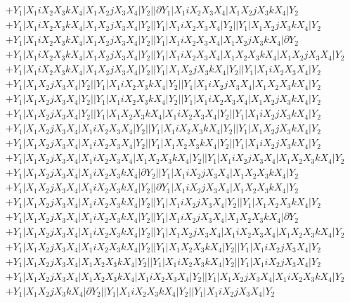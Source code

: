 \documentclass{article}[12pt]
\begin{document}
\begin{align*}
 & +Y_1|X_1iX_2X_3kX_4|X_1X_2jX_3X_4|Y_2||\partial Y_1|X_1iX_2X_3X_4|X_1X_2jX_3kX_4|Y_2\\ 
 & +Y_1|X_1iX_2X_3kX_4|X_1X_2jX_3X_4|Y_2||Y_1|X_1iX_2X_3X_4|Y_2||Y_1|X_1X_2jX_3kX_4|Y_2\\ 
 & +Y_1|X_1iX_2X_3kX_4|X_1X_2jX_3X_4|Y_2||Y_1|X_1iX_2X_3X_4|X_1X_2jX_3kX_4|\partial Y_2\\ 
 & +Y_1|X_1iX_2X_3kX_4|X_1X_2jX_3X_4|Y_2||Y_1|X_1iX_2X_3X_4|X_1X_2X_3kX_4|X_1X_2jX_3X_4|Y_2\\ 
 & +Y_1|X_1iX_2X_3kX_4|X_1X_2jX_3X_4|Y_2||Y_1|X_1X_2jX_3kX_4|Y_2||Y_1|X_1iX_2X_3X_4|Y_2\\ 
 & +Y_1|X_1X_2jX_3X_4|Y_2||Y_1|X_1iX_2X_3kX_4|Y_2||Y_1|X_1iX_2jX_3X_4|X_1X_2X_3kX_4|Y_2\\ 
 & +Y_1|X_1X_2jX_3X_4|Y_2||Y_1|X_1iX_2X_3kX_4|Y_2||Y_1|X_1iX_2X_3X_4|X_1X_2jX_3kX_4|Y_2\\ 
 & +Y_1|X_1X_2jX_3X_4|Y_2||Y_1|X_1X_2X_3kX_4|X_1iX_2X_3X_4|Y_2||Y_1|X_1iX_2jX_3kX_4|Y_2\\ 
 & +Y_1|X_1X_2jX_3X_4|X_1iX_2X_3X_4|Y_2||Y_1|X_1iX_2X_3kX_4|Y_2||Y_1|X_1X_2jX_3kX_4|Y_2\\ 
 & +Y_1|X_1X_2jX_3X_4|X_1iX_2X_3X_4|Y_2||Y_1|X_1X_2X_3kX_4|Y_2||Y_1|X_1iX_2jX_3kX_4|Y_2\\ 
 & +Y_1|X_1X_2jX_3X_4|X_1iX_2X_3X_4|X_1X_2X_3kX_4|Y_2||Y_1|X_1iX_2jX_3X_4|X_1X_2X_3kX_4|Y_2\\ 
 & +Y_1|X_1X_2jX_3X_4|X_1iX_2X_3kX_4|\partial Y_2||Y_1|X_1iX_2jX_3X_4|X_1X_2X_3kX_4|Y_2\\ 
 & +Y_1|X_1X_2jX_3X_4|X_1iX_2X_3kX_4|Y_2||\partial Y_1|X_1iX_2jX_3X_4|X_1X_2X_3kX_4|Y_2\\ 
 & +Y_1|X_1X_2jX_3X_4|X_1iX_2X_3kX_4|Y_2||Y_1|X_1iX_2jX_3X_4|Y_2||Y_1|X_1X_2X_3kX_4|Y_2\\ 
 & +Y_1|X_1X_2jX_3X_4|X_1iX_2X_3kX_4|Y_2||Y_1|X_1iX_2jX_3X_4|X_1X_2X_3kX_4|\partial Y_2\\ 
 & +Y_1|X_1X_2jX_3X_4|X_1iX_2X_3kX_4|Y_2||Y_1|X_1X_2jX_3X_4|X_1iX_2X_3X_4|X_1X_2X_3kX_4|Y_2\\ 
 & +Y_1|X_1X_2jX_3X_4|X_1iX_2X_3kX_4|Y_2||Y_1|X_1X_2X_3kX_4|Y_2||Y_1|X_1iX_2jX_3X_4|Y_2\\ 
 & +Y_1|X_1X_2jX_3X_4|X_1X_2X_3kX_4|Y_2||Y_1|X_1iX_2X_3kX_4|Y_2||Y_1|X_1iX_2jX_3X_4|Y_2\\ 
 & +Y_1|X_1X_2jX_3X_4|X_1X_2X_3kX_4|X_1iX_2X_3X_4|Y_2||Y_1|X_1X_2jX_3X_4|X_1iX_2X_3kX_4|Y_2\\ 
 & +Y_1|X_1X_2jX_3kX_4|\partial Y_2||Y_1|X_1iX_2X_3kX_4|Y_2||Y_1|X_1iX_2jX_3X_4|Y_2\\ 

\end{align*}
\end{document}

